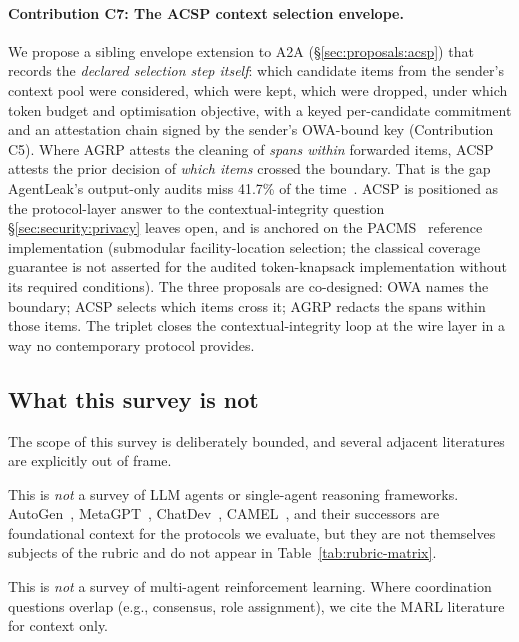 \paragraph{Contribution C7: The ACSP context selection envelope.}
We propose a sibling envelope extension to A2A
(\S\ref{sec:proposals:acsp}) that records the
\emph{declared selection step itself}: which candidate items from
the sender's context pool were considered, which were
kept, which were dropped, under which token budget and
optimisation objective, with a keyed per-candidate
commitment and an attestation chain signed by the
sender's OWA-bound key (Contribution C5). Where AGRP
attests the cleaning of \emph{spans within} forwarded
items, ACSP attests the prior decision of \emph{which
items} crossed the boundary. That is the gap AgentLeak's
output-only audits miss 41.7\% of the
time~\cite{agentleak}. ACSP is positioned as the
protocol-layer answer to the contextual-integrity
question \S\ref{sec:security:privacy} leaves open, and
is anchored on the PACMS~\cite{pacms_cikm_demo} reference
implementation (submodular facility-location selection;
the classical coverage guarantee is not asserted for the
audited token-knapsack implementation without its required
conditions). The three proposals are co-designed: OWA
names the boundary; ACSP selects which items cross it;
AGRP redacts the spans within those items. The triplet
closes the contextual-integrity loop at the wire layer
in a way no contemporary protocol provides.

\subsection{What this survey is not}
\label{sec:intro:notwhat}

The scope of this survey is deliberately bounded, and several
adjacent literatures are explicitly out of frame.

This is \emph{not} a survey of LLM agents or single-agent reasoning
frameworks. AutoGen~\cite{wu2023autogen},
MetaGPT~\cite{hong2024metagpt}, ChatDev~\cite{qian2024chatdev},
CAMEL~\cite{li2023camel}, and their successors
are foundational context for the protocols we evaluate, but they
are not themselves subjects of the rubric and do not appear in
Table~\ref{tab:rubric-matrix}.

This is \emph{not} a survey of multi-agent reinforcement learning.
Where coordination questions overlap (e.g., consensus, role
assignment), we cite the MARL literature for context only.

